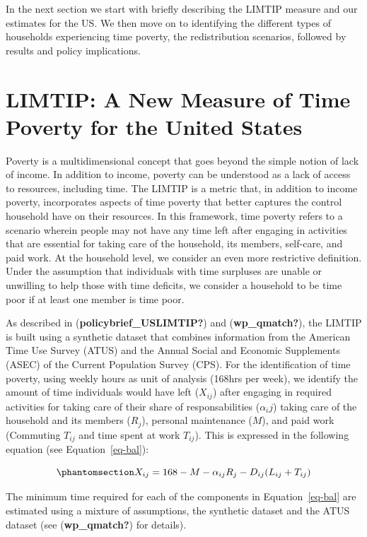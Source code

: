 \documentclass[
  11pt,
]{article}
\begin{document}
In the next section we start with briefly describing the LIMTIP measure
and our estimates for the US. We then move on to identifying the
different types of households experiencing time poverty, the
redistribution scenarios, followed by results and policy implications.

\section{LIMTIP: A New Measure of Time Poverty for the United
States}\label{limtip-a-new-measure-of-time-poverty-for-the-united-states}

Poverty is a multidimensional concept that goes beyond the simple notion
of lack of income. In addition to income, poverty can be understood as a
lack of access to resources, including time. The LIMTIP is a metric
that, in addition to income poverty, incorporates aspects of time
poverty that better captures the control household have on their
resources. In this framework, time poverty refers to a scenario wherein
people may not have any time left after engaging in activities that are
essential for taking care of the household, its members, self-care, and
paid work. At the household level, we consider an even more restrictive
definition. Under the assumption that individuals with time surpluses
are unable or unwilling to help those with time deficits, we consider a
household to be time poor if at least one member is time poor.

As described in (\textbf{policybrief\_USLIMTIP?}) and
(\textbf{wp\_qmatch?}), the LIMTIP is built using a synthetic dataset
that combines information from the American Time Use Survey (ATUS) and
the Annual Social and Economic Supplements (ASEC) of the Current
Population Survey (CPS). For the identification of time poverty, using
weekly hours as unit of analysis (168hrs per week), we identify the
amount of time individuals would have left (\(X_{ij}\)) after engaging
in required activities for taking care of their share of
responsabilities (\(\alpha_ij\)) taking care of the household and its
members (\(R_j\)), personal maintenance (\(M\)), and paid work
(Commuting \(T_{ij}\) and time spent at work \(T_{ij}\)). This is
expressed in the following equation (see Equation~\ref{eq-bal}):

\begin{equation}\phantomsection\label{eq-bal}{X_{ij} = 168 - M - \alpha_{ij}R_j-D_{ij}(L_{ij}+T_{ij})
}\end{equation}

The minimum time required for each of the components in
Equation~\ref{eq-bal} are estimated using a mixture of assumptions, the
synthetic dataset and the ATUS dataset (see (\textbf{wp\_qmatch?}) for
details).
\end{document}
